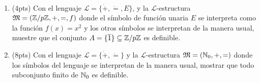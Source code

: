 \begin{sol}
\end{sol}

\begin{prob}
    \
    \begin{enumerate}[label=(\alph*)]
        \item (4pts) Con el lenguaje \(\mathcal{L}=\{\dot+,\dot=,E\}\), y la \(\mathcal{L}\)-estructura \(\mathfrak{{M}}=(\mathbb{Z}/p\mathbb{Z},+,=,f)\) donde el símbolo de función unaria \(E\) se interpreta como la función \(f(x)=x^2\) y los otros símbolos se interpretan de la manera usual, muestre que el conjunto \(A=\{\overline{1}\}\subseteq\mathbb{Z}/p\mathbb{Z}\) es definible.
        \item (8pts) Con el lenguaje \(\mathcal{L}=\{\dot+,\dot=\}\) y la \(\mathcal{L}\)-estructura \(\mathfrak{M}=(\mathbb{N}_0,+,=)\) donde los símbolos del lenguaje se interpretan de la manera usual, mostrar que todo subconjunto finito de \(\mathbb{N}_0\) es definible.
    \end{enumerate}
\end{prob}

